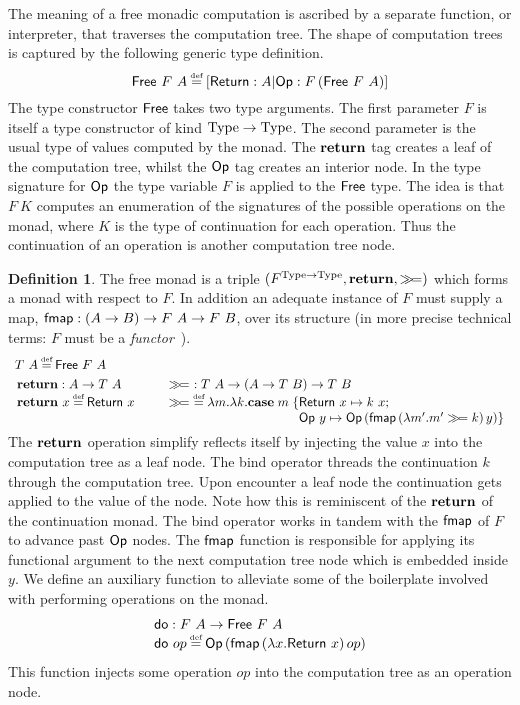 \documentclass[12pt,phd,lfcs,twoside,openright,logo,leftchapter,normalheadings]{infthesis}
\theoremstyle{plain}
\theoremstyle{definition}
\newtheorem{definition}[theorem]{Definition}
\begin{document}
The meaning of a free monadic computation is ascribed by a separate
function, or interpreter, that traverses the computation tree.
%
The shape of computation trees is captured by the following generic
type definition.
%
\[
  \Free~F~A \defas [\return:A|\OpF:F\,(\Free~F~A)]
\]
%
The type constructor $\mathsf{Free}$ takes two type arguments. The first
parameter $F$ is itself a type constructor of kind
$\textrm{Type} \to \textrm{Type}$. The second parameter is the usual type of
values computed by the monad. The $\mathbf{return}$ tag creates a leaf of the
computation tree, whilst the $\mathsf{Op}$ tag creates an interior node. In
the type signature for $\mathsf{Op}$ the type variable $F$ is applied to the
$\mathsf{Free}$ type. The idea is that $F~K$ computes an enumeration of the
signatures of the possible operations on the monad, where $K$ is the
type of continuation for each operation. Thus the continuation of an
operation is another computation tree node.
%
\begin{definition} The free monad is a triple
  $(F^{\textrm{Type} \to \textrm{Type}}, \mathbf{return}, \gg\!=)$ which forms a monad
  with respect to $F$. In addition an adequate instance of $F$ must
  supply a map, $\mathsf{fmap} : (A \to B) \to F~A \to F~B$, over its
  structure (in more precise technical terms: $F$ must be a
  \emph{functor}~\cite{Borceux94}).
  \[
   \bl
     \ba{@{~}l@{\qquad}@{~}r}
     \multicolumn{2}{l}{T~A \defas \Free~F~A} \smallskip\\
     \multirow{2}{*}{
       \bl
         \Return : A \to T~A\\
         \Return~x \defas \return~x
         \el} &
     \multirow{2}{*}{
       \bl
         \bind ~: T~A \to (A \to T~B) \to T~B\\
         \bind ~\defas \lambda m.\lambda k.\Case\;m\;\{
           \bl
              \return~x \mapsto k~x;\\
              \OpF~y    \mapsto \OpF\,(\fmap\,(\lambda m'. m' \bind k)\,y)\}
           \el
         \el}\\ & \\ &
       \ea
     \el
   \]
   The $\mathbf{return}$ operation simplify reflects itself by injecting the
   value $x$ into the computation tree as a leaf node. The bind
   operator threads the continuation $k$ through the computation
   tree. Upon encounter a leaf node the continuation gets applied to
   the value of the node. Note how this is reminiscent of the
   $\mathbf{return}$ of the continuation monad. The bind operator works in
   tandem with the $\mathsf{fmap}$ of $F$ to advance past $\mathsf{Op}$ nodes. The
   $\mathsf{fmap}$ function is responsible for applying its functional
   argument to the next computation tree node which is embedded inside
   $y$.
   We define an auxiliary function to alleviate some of the
   boilerplate involved with performing operations on the monad.
   \[
     \bl
       \DoF : F~A \to \Free~F~A\\
       \DoF~op \defas \OpF\,(\fmap\,(\lambda x.\return~x)\,op)
     \el
  \]
  This function injects some operation $op$ into the computation tree
  as an operation node.
\end{definition}
\end{document}
